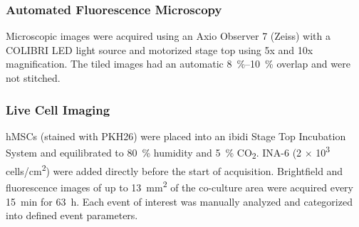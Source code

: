
\subsubsection*{Automated Fluorescence Microscopy}%
\label{C1:methods_microscopy}%
Microscopic images were acquired using an Axio Observer 7 (Zeiss) with a COLIBRI LED
light source and motorized stage top using 5x and 10x magnification. The tiled images had
an automatic \SIrange{8}{10}{\percent} overlap and were not stitched.



\subsubsection*{Live Cell Imaging}%
\label{C1:methods_livecell}%
hMSCs (stained with PKH26) were placed into an ibidi Stage Top Incubation System
and equilibrated to \SI{80}{\percent} humidity and \SI{5}{\percent}
CO\textsubscript{2}. INA-6 (2 $\times$ 10\textsuperscript{3}
cells/cm\textsuperscript{2}) were added directly before the start of
acquisition. Brightfield and fluorescence images of up to \SI{13}{\mm\squared}
of the co-culture area were acquired every \SI{15}{\minute} for \SI{63}{\hour}.
Each event of interest was manually analyzed and categorized into defined event
parameters.




